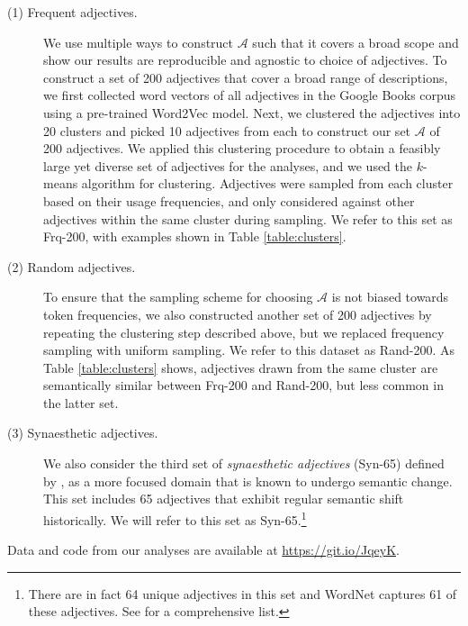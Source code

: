 \documentclass[output=paper]{langsci/langscibook}
\begin{document}
\begin{description}
\item[{\normalfont(1)} Frequent adjectives.] We use multiple ways to construct $\mathcal{A}$ such that it covers a broad scope and show our results are reproducible and agnostic to choice of adjectives.
To construct a set of 200 adjectives that cover a broad range of descriptions, we first collected word vectors of all adjectives in the Google Books corpus using a pre-trained Word2Vec model.
Next, we clustered the adjectives into 20 clusters and picked 10 adjectives from each to construct our set $\mathcal{A}$ of 200 adjectives. We applied this clustering procedure to obtain a feasibly large yet diverse set of adjectives for the analyses, and we used the $k$-means algorithm for clustering. Adjectives were sampled from each cluster based on their usage frequencies, and only considered against other adjectives within the same cluster during sampling.
We refer to this set as {\sc Frq-200}, with examples shown in Table \ref{table:clusters}.


\item[{\normalfont(2)} Random adjectives.] To ensure that the sampling scheme for choosing $\mathcal{A}$ is not biased towards token frequencies, we also constructed another set of 200 adjectives by repeating the clustering step  described above, but we replaced frequency sampling with uniform sampling.
We refer to this dataset as {\sc Rand-200}.
As Table \ref{table:clusters} shows, adjectives drawn from the same cluster are semantically similar between {\sc Frq-200} and {\sc Rand-200}, but less common in the latter set.

\item[{\normalfont(3)} Synaesthetic adjectives.] We also consider the third set of {\it synaesthetic adjectives} ({\sc Syn-65})  defined by \citet{williams1976}, as a more focused domain that is known to undergo semantic change. This set includes 65 adjectives that exhibit regular semantic shift historically. We will refer to this set as {\sc Syn-65}.\footnote{There are in fact 64 unique adjectives in this set and WordNet captures 61 of these adjectives.
See \citet{williams1976} for a comprehensive list.}
\end{description}

Data and code from our analyses are available at \url{https://git.io/JqeyK}.%
\end{document}
